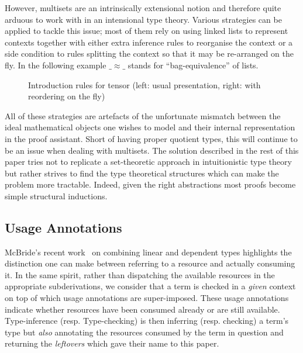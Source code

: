 \documentclass[a4paper,UKenglish]{lipics-v2016}
\begin{document}
However, multisets are an intrinsically extensional notion and
therefore quite arduous to work with in an intensional type
theory. Various strategies can be applied to tackle this issue;
most of them rely on using linked lists to represent contexts
together with either extra inference rules to reorganise the
context or a side condition to rules splitting the context so
that it may be re-arranged on the fly. In the following example
$\_≈\_$ stands for ``bag-equivalence'' of lists.
\begin{figure}[h]
\caption{Introduction rules for tensor (left: usual presentation, right: with reordering on the fly)\label{rule:tensor}}
\end{figure}

All of these strategies are artefacts of the unfortunate mismatch
between the ideal mathematical objects one wishes to model and
their internal representation in the proof assistant. Short of
having proper quotient types, this will continue to be an issue
when dealing with multisets. The solution described in the rest
of this paper tries not to replicate a set-theoretic approach in
intuitionistic type theory but rather strives to find the type
theoretical structures which can make the problem more tractable.
Indeed, given the right abstractions most proofs become simple
structural inductions.

\subsection{Usage Annotations}

McBride's recent work~\cite{mcbride2016got} on combining linear and
dependent types highlights the distinction one can make between
referring to a resource and actually consuming it. In the same spirit,
rather than dispatching the available resources in the appropriate
subderivations, we consider that a term is checked in a \emph{given}
context on top of which usage annotations are super-imposed. These
usage annotations indicate whether resources have been consumed already
or are still available. Type-inference (resp. Type-checking) is then
inferring (resp. checking) a term's type but \emph{also} annotating
the resources consumed by the term in question and returning the
\emph{leftovers} which gave their name to this paper.
\end{document}
